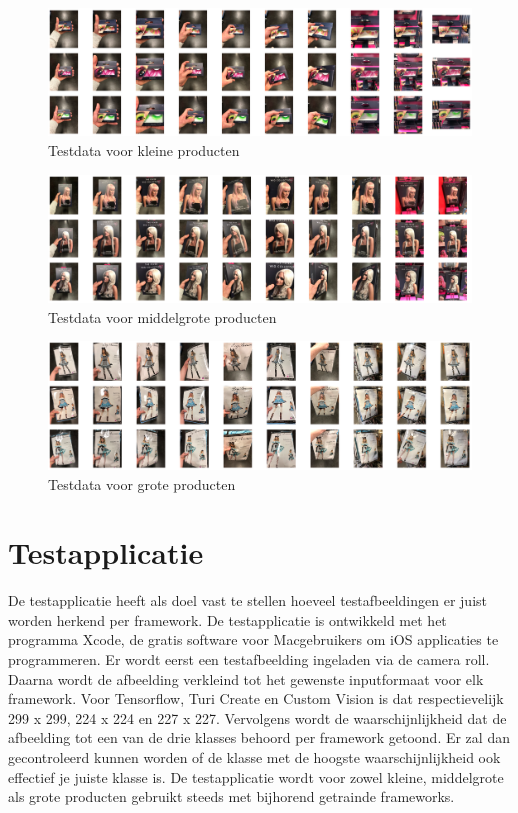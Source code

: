   \begin{figure}[h!]
    \centering
        \includegraphics[width=1\textwidth]{img/testklein.png}
    \caption{Testdata voor kleine producten}
    \label{fig:testklein}
  \end{figure}

  \begin{figure}[h!]
    \centering
        \includegraphics[width=1\textwidth]{img/testmiddel.png}
    \caption{Testdata voor middelgrote producten}
    \label{fig:testmiddel}
  \end{figure}

  \begin{figure}[h!]
    \centering
        \includegraphics[width=1\textwidth]{img/testgroot.png}
    \caption{Testdata voor grote producten}
    \label{fig:testgroot}
  \end{figure}

\section{Testapplicatie}
\label{sec:Testapplicatie}

De testapplicatie heeft als doel vast te stellen hoeveel testafbeeldingen er juist worden herkend per framework. De testapplicatie is ontwikkeld met het programma Xcode, de gratis software voor Macgebruikers om iOS applicaties te programmeren. Er wordt eerst een testafbeelding ingeladen via de camera roll. Daarna wordt de afbeelding verkleind tot het gewenste inputformaat voor elk framework. Voor Tensorflow, Turi Create en Custom Vision is dat respectievelijk 299 x 299, 224 x 224 en 227 x 227. Vervolgens wordt de waarschijnlijkheid dat de afbeelding tot een van de drie klasses behoord per framework getoond. Er zal dan gecontroleerd kunnen worden of de klasse met de hoogste waarschijnlijkheid ook effectief je juiste klasse is. De testapplicatie wordt voor zowel kleine, middelgrote als grote producten gebruikt steeds met bijhorend getrainde frameworks.  
  
